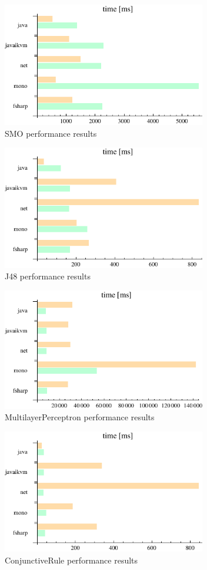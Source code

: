\documentclass[journal]{IEEEtran/IEEEtran}
\begin{document}
\begin{figure}[H]
\centering
\includegraphics[width=3.5in]{SMO}
\caption{SMO performance results}
\end{figure}
\begin{figure}[H]
\centering
\includegraphics[width=3.5in]{J48}
\caption{J48 performance results}
\end{figure}
\begin{figure}[H]
\centering
\includegraphics[width=3.5in]{MultilayerPerceptron}
\caption{MultilayerPerceptron performance results}
\end{figure}
\begin{figure}[H]
\centering
\includegraphics[width=3.5in]{ConjunctiveRule}
\caption{ConjunctiveRule performance results}
\end{figure}
\end{document}
